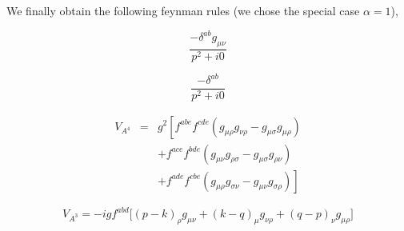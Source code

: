 \documentclass[a4paper,11pt]{article} %
\numberwithin{equation}{section} %
\numberwithin{figure}{section} %
\theoremstyle{plain} %
\theoremstyle{definition} %
\theoremstyle{remark} %
\begin{document}
\noindent
We finally obtain the following feynman rules (we chose the special case $\alpha=1$),

\begin{minipage}[c]{0.45\linewidth}
 \begin{equation*}
  \frac{- \delta^{ab} g_{\mu \nu} }{p^2 + i0}
 \end{equation*}
\end{minipage} \hfill
\begin{minipage}[c]{0.45\linewidth}
 \begin{center}
 \end{center}
\end{minipage}

\begin{minipage}[c]{0.45\linewidth}
 \begin{equation*}
  \frac{- \delta^{ab} }{p^2 + i0}
 \end{equation*}
\end{minipage} \hfill
\begin{minipage}[c]{0.45\linewidth}
 \begin{center}
 \end{center}
\end{minipage}

\begin{minipage}[c]{0.45\linewidth}
 \begin{eqnarray*}
   V_{A^{4}} &=& g^{2} \left[ f^{abe} f^{cde} \left( g_{\mu \rho}g_{\nu \rho} - g_{\mu \sigma}g_{\mu \rho} \right) \right.\\
&& + f^{ace} f^{bde} \left( g_{\mu \nu}g_{\rho \sigma} - g_{\mu \sigma}g_{\rho \nu} \right) \\
&& \left. +f^{ade} f^{cbe} \left( g_{\mu \rho}g_{\sigma \nu} - g_{\mu \nu}g_{\sigma \rho} \right) \right]
 \end{eqnarray*}
\end{minipage} \hfill
\begin{minipage}[c]{0.45\linewidth}
 \begin{center}
 \end{center}
\end{minipage}

\begin{minipage}[c]{0.45\linewidth}
 \begin{equation*}
  V_{A^3} = -igf^{abd} \Big[ (p-k)_{\rho} g_{\mu \nu} + (k-q)_{\mu} g_{\nu \rho} + (q-p)_{\nu} g_{\mu \rho} \Big]
 \end{equation*}
\end{minipage} \hfill
\begin{minipage}[c]{0.45\linewidth}
 \begin{center}
 \end{center}
\end{minipage}
\end{document}
